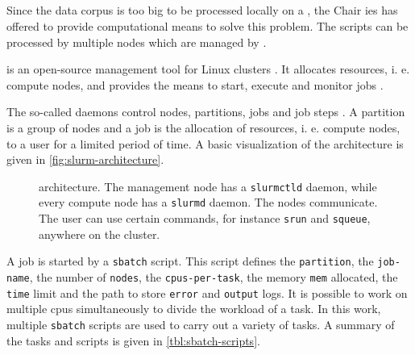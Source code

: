 
\subsection{\slurm{}}\label{subsec:slurm}

Since the data corpus is too big to be processed locally on a \localMaschineStats{}, the Chair \ac{ies} has offered to provide computational means to solve this problem.
The scripts can be processed by multiple nodes which are managed by \slurm{}.

\slurm{} is an open-source management tool for Linux clusters \cite{slurm-online}.
It allocates resources, i. e. compute nodes, and provides the means to start, execute and monitor jobs \cite{slurm-online, slurm2003}.

The so-called \slurm{} daemons control nodes, partitions, jobs and job steps \cite{slurm-online}.
A partition is a group of nodes and a job is the allocation of resources, i. e. compute nodes, to a user for a limited period of time.
A basic visualization of the architecture is given in \autoref{fig:slurm-architecture}.

\begin{figure}[!htb] %
    \centering
    
    \caption[\slurm{} architecture]{\slurm{} architecture. The management node has a \texttt{slurmctld} daemon, while every compute node has a \texttt{slurmd} daemon.
    The nodes communicate.
    The user can use certain commands, for instance \texttt{srun} and \texttt{squeue}, anywhere on the cluster.
    }
    \label{fig:slurm-architecture}
\end{figure}

A job is started by a \texttt{sbatch} script.
This script defines the \texttt{partition}, the \texttt{job-name}, the number of \texttt{nodes}, the \texttt{cpus-per-task}, the memory \texttt{mem} allocated, 
the \texttt{time} limit and the path to store \texttt{error} and \texttt{output} logs.
It is possible to work on multiple \acp{cpu} simultaneously to divide the workload of a task.
In this work, multiple \texttt{sbatch} scripts are used to carry out a variety of tasks.
A summary of the tasks and scripts is given in \autoref{tbl:sbatch-scripts}.


